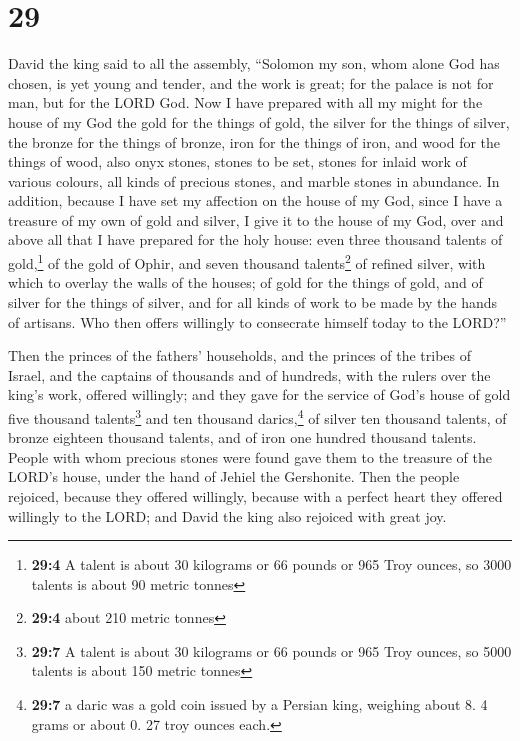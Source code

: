 \hypertarget{section-28}{%
\section{29}\label{section-28}}

 David the king said to all the assembly, ``Solomon my
son, whom alone God has chosen, is yet young and tender, and the work is
great; for the palace is not for man, but for the LORD God.
 Now I have prepared with all my might for the house of my
God the gold for the things of gold, the silver for the things of
silver, the bronze for the things of bronze, iron for the things of
iron, and wood for the things of wood, also onyx stones, stones to be
set, stones for inlaid work of various colours, all kinds of precious
stones, and marble stones in abundance.  In addition,
because I have set my affection on the house of my God, since I have a
treasure of my own of gold and silver, I give it to the house of my God,
over and above all that I have prepared for the holy house:
 even three thousand talents of gold,\footnote{\textbf{29:4}
  A talent is about 30 kilograms or 66 pounds or 965 Troy ounces, so
  3000 talents is about 90 metric tonnes} of the gold of Ophir, and
seven thousand talents\footnote{\textbf{29:4} about 210 metric tonnes}
of refined silver, with which to overlay the walls of the houses;
 of gold for the things of gold, and of silver for the
things of silver, and for all kinds of work to be made by the hands of
artisans. Who then offers willingly to consecrate himself today to the
LORD?''

 Then the princes of the fathers' households, and the
princes of the tribes of Israel, and the captains of thousands and of
hundreds, with the rulers over the king's work, offered willingly;
 and they gave for the service of God's house of gold five
thousand talents\footnote{\textbf{29:7} A talent is about 30 kilograms
  or 66 pounds or 965 Troy ounces, so 5000 talents is about 150 metric
  tonnes} and ten thousand darics,\footnote{\textbf{29:7} a daric was a
  gold coin issued by a Persian king, weighing about 8. 4 grams or about
  0. 27 troy ounces each.} of silver ten thousand talents, of bronze
eighteen thousand talents, and of iron one hundred thousand talents.
 People with whom precious stones were found gave them to
the treasure of the LORD's house, under the hand of Jehiel the
Gershonite.  Then the people rejoiced, because they
offered willingly, because with a perfect heart they offered willingly
to the LORD; and David the king also rejoiced with great joy.

